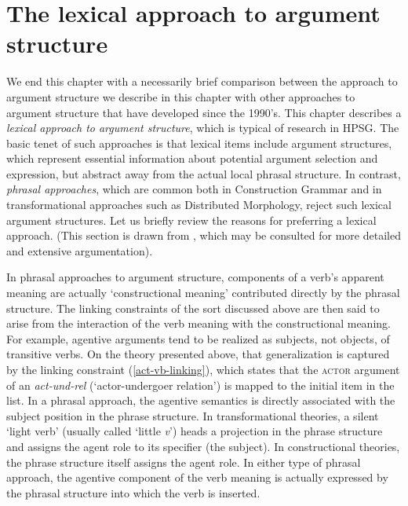 \documentclass[output=paper]{langsci/langscibook}
\begin{document}
\section{The lexical approach to argument structure}
\label{lexicalapproach}

We end this chapter with a necessarily brief comparison between the approach to argument structure we describe in this chapter with other approaches to argument structure that have developed since the 1990's.
This chapter describes a \textit{lexical approach to argument structure}, which is typical of research in HPSG.  The basic tenet of such approaches is that lexical items include argument structures, which represent essential information about potential argument selection and expression, but
abstract away from the actual local phrasal structure.  In contrast, \emph{phrasal approaches}, which
are common both in Construction Grammar and in transformational approaches such as Distributed Morphology, reject such lexical argument structures.   Let us briefly review the reasons for preferring a lexical approach. (This section is drawn from \citet{Mueller+Wechsler:2014}, which may be consulted for more detailed and extensive argumentation). 

In phrasal approaches to argument structure, components of a verb's apparent meaning are actually `constructional meaning' contributed directly by the phrasal structure.  The linking constraints of the sort discussed above are then said to arise from the interaction of the verb meaning with the constructional meaning.  For example, agentive arguments tend to be realized as subjects, not objects, of transitive verbs.  On the theory presented above, that generalization is captured by the linking constraint (\ref{act-vb-linking}), which states that the \textsc{actor} argument of an \textit{act-und-rel} (`actor-undergoer relation') is mapped to the initial item in the \argst list.  In a phrasal approach, the agentive semantics is directly associated with the subject position in the phrase structure.  In transformational theories, a silent `light verb' (usually called `little \textit{v}') heads a projection in the phrase structure and assigns the agent role to its specifier (the subject).  In constructional theories, the phrase structure itself assigns the agent role.  In either type of phrasal approach, the agentive component of the verb meaning is actually expressed by the phrasal structure into which the verb is inserted.  
\end{document}
